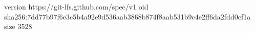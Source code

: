 version https://git-lfs.github.com/spec/v1
oid sha256:7dd77b97f6e3c5b4a92e9d536aab3868b874f8aab531b9c4e2ff6da2fdd0cf1a
size 3528
